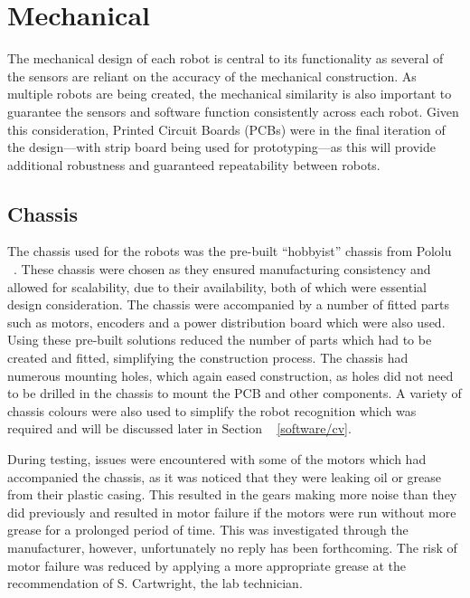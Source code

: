 
\chapter{Mechanical}\label{mechanical}

The mechanical design of each robot is central to its 
functionality as several of the sensors are
reliant on the accuracy of the mechanical construction. As 
multiple robots are being created, 
the mechanical similarity is also important to guarantee the 
sensors and software function consistently across each robot. 
Given this consideration, Printed Circuit Boards (PCBs) were in 
the
final iteration of the design---with strip board being used for 
prototyping---as this will provide additional robustness and 
guaranteed repeatability between robots.

\section{Chassis}\label{mech/chassis}
The chassis used for the robots was the pre-built ``hobbyist'' 
chassis from Pololu ~\cite{pololuchassis}. These chassis were 
chosen as they ensured manufacturing  consistency and allowed 
for scalability, due to their availability, both of which were 
essential design consideration. The chassis were accompanied by 
a number of fitted parts such as motors, encoders and a power 
distribution board which were also used. Using these pre-built 
solutions reduced the number of parts which had to be created 
and fitted, simplifying the construction process.
The chassis had numerous mounting holes, which again eased 
construction, as holes did not need to be drilled in the chassis 
to mount the PCB and other components. A variety of chassis 
colours were also used to simplify the robot recognition which 
was required and will be discussed later in Section ~
\ref{software/cv}. 

During testing, issues were encountered with some of the motors 
which had accompanied the chassis, as it was noticed that they 
were leaking oil or grease from their plastic casing. This 
resulted in the gears making more noise than they did previously 
and resulted in motor failure if the motors were run without 
more grease for a prolonged period of time. This was 
investigated through the manufacturer, however, unfortunately no 
reply has been forthcoming. The risk of motor failure was 
reduced by applying a more appropriate grease at the 
recommendation of S. Cartwright, the lab 
technician.  

